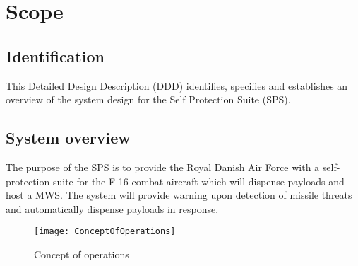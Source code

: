 \documentclass[Main]{subfiles}
\begin{document}
\chapter{Scope}

\section{Identification}
This Detailed Design Description (DDD) identifies, specifies and establishes an overview of the system design for the Self Protection Suite (SPS).

\section{System overview}
The purpose of the SPS is to provide the Royal Danish Air Force with a self-protection suite for the F-16 combat aircraft which will dispense payloads and host a MWS. 
The system will provide warning upon detection of missile threats and automatically dispense payloads in response.

\begin{figure}[H]
\centering
\texttt{[image: ConceptOfOperations]}
\caption{Concept of operations}
\end{figure}
\end{document}
